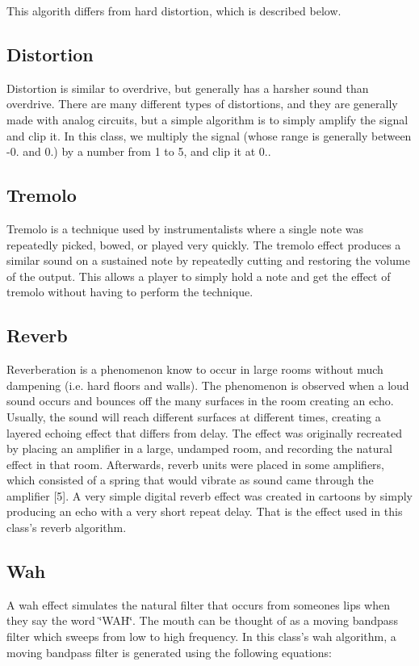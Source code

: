This algorith differs from hard distortion, which is described below.\hypertarget{index_distortion}{}\subsection{Distortion}\label{index_distortion}
Distortion is similar to overdrive, but generally has a harsher sound than overdrive. There are many different types of distortions, and they are generally made with analog circuits, but a simple algorithm is to simply amplify the signal and clip it. In this class, we multiply the signal (whose range is generally between -\/0. and 0.) by a number from 1 to 5, and clip it at 0..\hypertarget{index_tremolo}{}\subsection{Tremolo}\label{index_tremolo}
Tremolo is a technique used by instrumentalists where a single note was repeatedly picked, bowed, or played very quickly. The tremolo effect produces a similar sound on a sustained note by repeatedly cutting and restoring the volume of the output. This allows a player to simply hold a note and get the effect of tremolo without having to perform the technique.\hypertarget{index_reverb}{}\subsection{Reverb}\label{index_reverb}
Reverberation is a phenomenon know to occur in large rooms without much dampening (i.\+e. hard floors and walls). The phenomenon is observed when a loud sound occurs and bounces off the many surfaces in the room creating an echo. Usually, the sound will reach different surfaces at different times, creating a layered echoing effect that differs from delay. The effect was originally recreated by placing an amplifier in a large, undamped room, and recording the natural effect in that room. Afterwards, reverb units were placed in some amplifiers, which consisted of a spring that would vibrate as sound came through the amplifier \mbox{[}5\mbox{]}. A very simple digital reverb effect was created in cartoons by simply producing an echo with a very short repeat delay. That is the effect used in this class's reverb algorithm.\hypertarget{index_wah}{}\subsection{Wah}\label{index_wah}
A wah effect simulates the natural filter that occurs from someones lips when they say the word \char`\"{}\+W\+A\+H\char`\"{}. The mouth can be thought of as a moving bandpass filter which sweeps from low to high frequency. In this class's wah algorithm, a moving bandpass filter is generated using the following equations\+:

